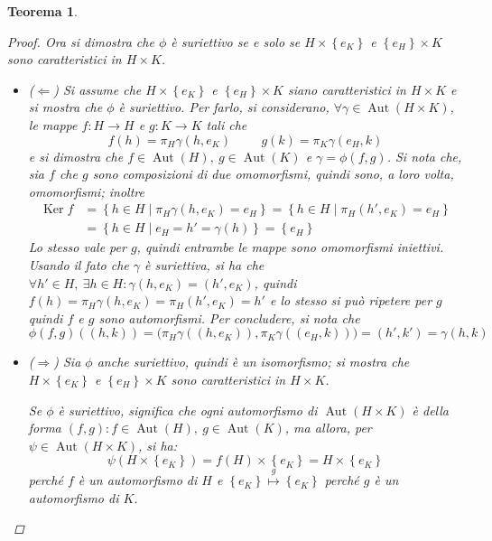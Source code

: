 \documentclass[12pt]{scrartcl}
\theoremstyle{style}
\newtheorem{teorema}{Teorema}[section]
\numberwithin{equation}{subsection}
\begin{document}
\begin{teorema}
\begin{proof}
Ora si dimostra che $\phi $ \`e suriettivo se e solo se $H \times \left\{ e_K \right\} $ e $\left\{ e_H \right\} \times K$ sono caratteristici in $H\times K$.
\begin{itemize}
	\item ($\Leftarrow $) Si assume che $H \times \left\{ e_K \right\} $ e $\left\{ e_H \right\} \times K$ siano caratteristici in $H \times K$ e si mostra che $\phi $ \`e suriettivo.
		Per farlo, si considerano, $\forall \gamma \in  \operatorname{Aut} (H \times K)$, le mappe $f: H \to H$ e $g : K \to K $ tali che
		\[
		f(h) = \pi_H \gamma(h,e_K) \hspace{1cm} g(k) = \pi_K \gamma(e_H,k)
		\] 
		e si dimostra che $f \in \operatorname{Aut} (H), \ g\in \operatorname{Aut} (K)$ e $\gamma = \phi (f,g)$.
		Si nota che, sia $f$ che $g$ sono composizioni di due omomorfismi, quindi sono, a loro volta, omomorfismi; inoltre
		\[
		\begin{split}
				\operatorname{Ker} f &= \left\{ h \in H  \mid \pi _H \gamma(h,e_K) = e_H \right\} = \left\{ h \in H  \mid \pi_H ( h', e_K) = e_H \right\} \\
						     &= \left\{ h \in H  \mid e_H = h'= \gamma(h) \right\} = \left\{ e_H \right\} 
		\end{split}
		\] 
	Lo stesso vale per $g$, quindi entrambe le mappe sono omomorfismi iniettivi.
	Usando il fato che $\gamma$ \`e suriettiva, si ha che $\forall h' \in  H , \ \exists h \in H : \gamma(h,e_K) = (h',e_K)$, quindi $f(h) = \pi_H \gamma(h,e_K) = \pi_H(h',e_K) = h'$ e lo stesso si pu\`o ripetere per $g$ quindi $f$ e $g$ sono automorfismi.
	Per concludere, si nota che
	\[
	\phi (f,g)((h,k)) = \big(\pi_H \gamma((h,e_K)),\pi_K \gamma((e_H,k))\big) = (h',k') = \gamma(h,k)
	\] 
\item ($\Rightarrow $) Sia $\phi $ anche suriettivo, quindi \`e un isomorfismo; si mostra che $H \times \left\{ e_K \right\} $ e $\left\{ e_ H\right\}  \times  K$ sono caratteristici in $H \times K$.

	Se $\phi  $ \`e suriettivo, significa che ogni automorfismo di $\operatorname{Aut} (H \times K) $ \`e della forma $(f,g) : f \in \operatorname{Aut} (H) , \ g \in \operatorname{Aut} (K)$, ma allora, per $\psi  \in  \operatorname{Aut}(H \times K )$, si ha:
	\[
	\psi (H \times \left\{ e_K \right\} ) = f(H) \times \left\{ e_K \right\} = H \times \left\{ e_K \right\} 
	\] 
	perch\'e $f$ \`e un automorfismo di $H$ e $\left\{ e_K \right\} \stackrel{g}{\longmapsto} \left\{ e_K \right\} $ perch\'e $g$ \`e un automorfismo di $K$.
\end{itemize}
	\end{proof}
\end{teorema}
\end{document}
